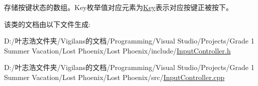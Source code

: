 存储按键状态的数组。\+Key枚举值对应元素为\hyperlink{class_input_controller_a840a7425e2220e1ef5659a7ea4ba122d}{Key}表示对应按键正被按下。 



该类的文档由以下文件生成\+:\begin{DoxyCompactItemize}
\item 
D\+:/叶志浩文件夹/\+Vigilans的文档/\+Programming/\+Visual Studio/\+Projects/\+Grade 1 Summer Vacation/\+Lost Phoenix/\+Lost Phoenix/include/\hyperlink{_input_controller_8h}{Input\+Controller.\+h}\item 
D\+:/叶志浩文件夹/\+Vigilans的文档/\+Programming/\+Visual Studio/\+Projects/\+Grade 1 Summer Vacation/\+Lost Phoenix/\+Lost Phoenix/src/\hyperlink{_input_controller_8cpp}{Input\+Controller.\+cpp}\end{DoxyCompactItemize}
